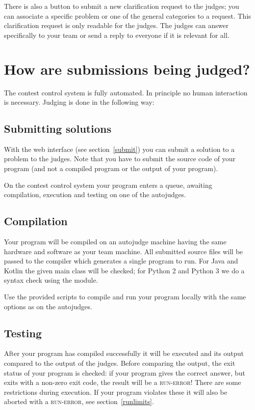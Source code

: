 There is also a button to submit a new clarification request to the
judges; you can associate a specific problem or one of the general
categories to a request. This clarification request is only readable
for the judges. The judges can answer specifically to your team or send a
reply to everyone if it is relevant for all.

\section{How are submissions being judged?}\label{howjudged}

The \DOMjudge contest control system is fully automated. In principle no human
interaction is necessary. Judging is done in the following way:

\subsection{Submitting solutions}

With%
the web interface (see section~\ref{submit}) you can submit a solution
to a problem to the judges. Note that you have to submit the source code
of your program (and not a compiled program or the output of your
program).

On the contest control system your program enters a queue, awaiting compilation,
execution and testing on one of the autojudges.

\subsection{Compilation}

Your program will be compiled on an autojudge machine having the same
hardware and software as your team machine.
All submitted source files will be passed to the compiler which
generates a single program to run. For Java and Kotlin the given
main class will be checked; for Python 2 and Python 3 we do a
syntax check using the  module.

Use the provided scripts to compile and run your program locally with
the same options as on the autojudges.

\subsection{Testing}\label{testing}

After your program has compiled successfully it will be executed and
its output compared to the output of the judges. Before comparing the
output, the exit status of your program is checked: if your program
gives the correct answer, but exits with a non-zero exit code, the
result will be a \textsc{run-error}! There are some restrictions during
execution. If your program violates these it will also be aborted
with a \textsc{run-error}, see section~\ref{runlimits}.

